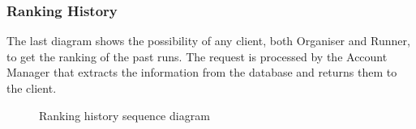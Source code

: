 \subsubsection{Ranking History}
The last diagram shows the possibility of any client, both Organiser and Runner, to get the ranking of the past runs. The request is processed by the Account Manager that extracts the information from the database and returns them to the client.

\begin{figure}[H]
    \centering
    \caption{Ranking history sequence diagram}
    \label{fig:log&regDiagram}
\end{figure}